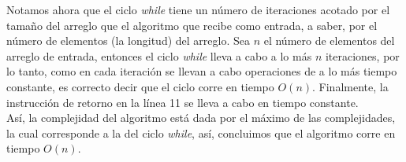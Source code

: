 \documentclass[a4paper, 12pt]{report}
\begin{document}
\begin{enumerate}
{\begin{enumerate}
        Notamos ahora que el ciclo {\it while} tiene un número de iteraciones
        acotado por el tamaño del arreglo que el algoritmo que recibe como
        entrada, a saber, por el número de elementos (la longitud) del arreglo.
        Sea $n$ el número de elementos del arreglo de entrada, entonces el ciclo
        {\it while} lleva a cabo a lo más $n$ iteraciones, por lo tanto,
        como en cada iteración se llevan a cabo operaciones de a lo más tiempo
        constante, es correcto decir que el ciclo corre en tiempo $O(n)$.
        Finalmente, la instrucción de retorno en la línea 11 se lleva a cabo en
        tiempo constante.\\
        Así, la complejidad del algoritmo está dada por el máximo de las
        complejidades, la cual corresponde a la del ciclo {\it while}, así,
        concluimos que el algoritmo corre en tiempo $O(n)$.



\end{enumerate}}
\end{enumerate}
\end{document}
